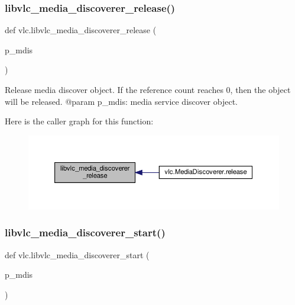 \subsubsection{\texorpdfstring{libvlc\+\_\+media\+\_\+discoverer\+\_\+release()}{libvlc\_media\_discoverer\_release()}}
{\footnotesize\ttfamily def vlc.\+libvlc\+\_\+media\+\_\+discoverer\+\_\+release (\begin{DoxyParamCaption}\item[{}]{p\+\_\+mdis }\end{DoxyParamCaption})}

\begin{DoxyVerb}Release media discover object. If the reference count reaches 0, then
the object will be released.
@param p_mdis: media service discover object.
\end{DoxyVerb}
 Here is the caller graph for this function\+:
\nopagebreak
\begin{figure}[H]
\begin{center}
\leavevmode
\includegraphics[width=350pt]{namespacevlc_adddb8a8785beb08b0599ccb43c3ddffd_icgraph}
\end{center}
\end{figure}
\mbox{\label{namespacevlc_a717cf33da5cb426ea198e5cc7c23fcac}} 
\subsubsection{\texorpdfstring{libvlc\+\_\+media\+\_\+discoverer\+\_\+start()}{libvlc\_media\_discoverer\_start()}}
{\footnotesize\ttfamily def vlc.\+libvlc\+\_\+media\+\_\+discoverer\+\_\+start (\begin{DoxyParamCaption}\item[{}]{p\+\_\+mdis }\end{DoxyParamCaption})}

